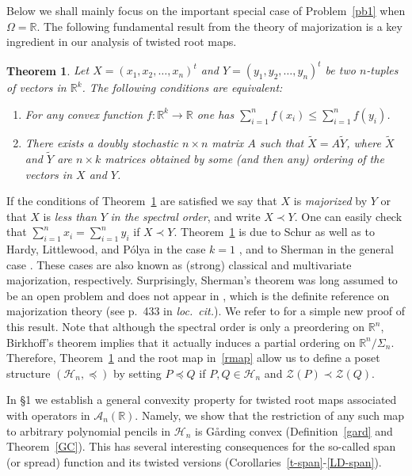 \documentclass[10pt,twoside,a4paper,reqno]{amsart}
\theoremstyle{plain}
\newtheorem{theo+}           {Theorem}
\theoremstyle{definition}
\theoremstyle{remark}
\newenvironment{theorem}{\begin{theo+}}{\end{theo+}}
\newcommand {\bR} {\mathbb {R}}
\newcommand {\calH} {\mathcal {H}}
\newcommand {\calA} {\mathcal {A}}
\newcommand {\calZ} {\mathcal {Z}}
\begin{document}
Below we shall mainly focus on the important special case 
of Problem~\ref{pb1} when $\Omega=\bR$.
The following fundamental result from the theory of majorization 
is a key ingredient in our analysis of twisted root maps.

\begin{theorem}\label{spec}
Let $X=(x_{1},x_{2},\ldots,x_{n})^t$ and $Y=(y_{1},y_{2},\ldots,y_{n})^t$ be
two $n$-tuples of vectors in $\bR^{k}$. The following conditions are 
equivalent:
\begin{enumerate}
\item[(i)] For any convex function $f: \bR^k \to \bR$ one
has $\sum_{i=1}^{n}f(x_{i})\le \sum_{i=1}^{n}f(y_{i})$.
\item[(ii)] There exists a doubly stochastic $n\times n$ matrix $A$ such that
$\tilde  X=A\tilde  Y$, where $\tilde X$ and $\tilde Y$ are 
$n\times k$ matrices obtained by some (and then any) ordering of the vectors 
in $X$ and $Y$.
\end{enumerate}
\end{theorem}

If the conditions of Theorem~\ref{spec} are satisfied we say that 
$X$ is {\em majorized} by $Y$ or that $X$ is {\em less than} $Y$ 
{\em in the spectral order}, and write $X\prec Y$. One can easily check that 
$\sum_{i=1}^nx_{i}=\sum_{i=1}^ny_{i}$ if $X\prec Y$. 
Theorem~\ref{spec} is due 
to Schur as well as to Hardy, Littlewood, and P\'olya in the case $k=1$
\cite{HLP}, and to Sherman in the general case \cite{S}. These cases 
are also known as (strong) classical and multivariate majorization, 
respectively. 
Surprisingly, Sherman's theorem was long assumed to be an open problem 
and does not appear in \cite{MO}, which is the definite reference on 
majorization theory (see p.~433 in {\em loc.~cit.}). We refer to \cite{B1} 
for 
a simple new proof of this result. Note that although the spectral order is 
only a 
preordering on $\bR^n$, Birkhoff's theorem \cite[Theorem 2.A.2]{MO} implies 
that it actually induces a partial ordering on $\bR^n/\Sigma_n$. Therefore, 
Theorem~\ref{spec} and the root map in~\eqref{rmap} allow us to 
define a poset structure $(\calH_n,\preccurlyeq)$ by setting 
$P\preccurlyeq Q$ if $P,Q\in \calH_{n}$ and $\calZ(P)\prec \calZ(Q)$.

In \S 1 we establish a general convexity property for 
twisted root maps associated with operators in $\calA_n(\bR)$.
Namely, we show that the restriction of any such map to arbitrary polynomial 
pencils in $\calH_{n}$ is G\aa rding convex 
(Definition~\ref{gard} and Theorem~\ref{GC}). This has several interesting 
consequences for the so-called span (or spread) function and its twisted 
versions (Corollaries~\ref{t-span}-\ref{LD-span}). 
\end{document}
